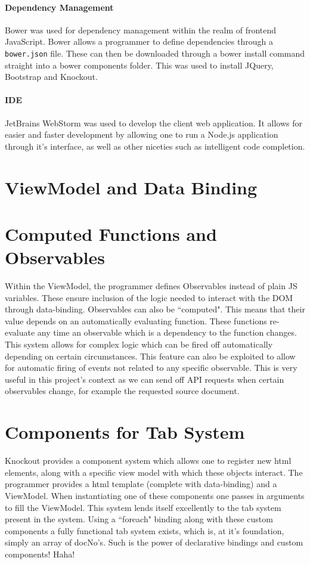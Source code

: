\documentclass{l4proj}
\newcommand{\code}[1]{\texttt{#1}}
\begin{document}
\paragraph{Dependency Management}
Bower was used for dependency management within the realm of frontend JavaScript. Bower allows a programmer to define dependencies through a \code{bower.json} file. These can then be downloaded through a bower install command straight into a bower components folder. This was used to install JQuery, Bootstrap and Knockout.

\paragraph{IDE}
JetBrains WebStorm was used to develop the client web application. It allows for easier and faster development by allowing one to run a Node.js application through it's interface, as well as other niceties such as intelligent code completion.

\section{ViewModel and Data Binding} \label{viewmodels}

\section{Computed Functions and Observables}
Within the ViewModel, the programmer defines Observables instead of plain JS variables. These ensure inclusion of the logic needed to interact with the DOM through data-binding. Observables can also be ``computed". This means that their value depends on an automatically evaluating function. These functions re-evaluate any time an observable which is a dependency to the function changes. This system allows for complex logic which can be fired off automatically depending on certain circumstances.
This feature can also be exploited to allow for automatic firing of events not related to any specific observable. This is very useful in this project's context as we can send off API requests when certain observables change, for example the requested source document.

\section{Components for Tab System}
Knockout provides a component system which allows one to register new html elements, along with a specific view model with which these objects interact. The programmer provides a html template (complete with data-binding) and a ViewModel. When instantiating one of these components one passes in arguments to fill the ViewModel.
This system lends itself excellently to the tab system present in the system. Using a ``foreach" binding along with these custom components a fully functional tab system exists, which is, at it's foundation, simply an array of docNo's. Such is the power of declarative bindings and custom components! Haha!
\end{document}
